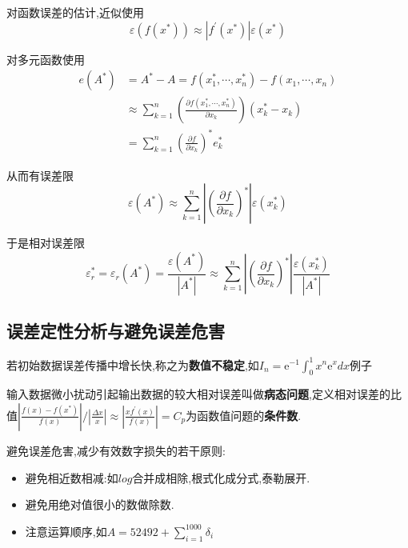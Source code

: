 \documentclass[10pt]{yerbaformat}
\begin{document}
\par 对函数误差的估计,近似使用$$\varepsilon\left(f\left(x^{*}\right)\right) \approx\left|f^{\prime}\left(x^{*}\right)\right| \varepsilon\left(x^{*}\right)$$
\par 对多元函数使用$$\begin{aligned}
        e\left(A^{*}\right) & =A^{*}-A=f\left(x_{1}^{*}, \cdots, x_{n}^{*}\right)-f\left(x_{1}, \cdots, x_{n}\right)                                                    \\
                            & \approx \sum_{k=1}^{n}\left(\frac{\partial f\left(x_{1}^{*}, \cdots, x_{n}^{*}\right)}{\partial x_{k}}\right)\left(x_{k}^{*}-x_{k}\right) \\
                            & =\sum_{k=1}^{n}\left(\frac{\partial f}{\partial x_{k}}\right)^{*} e_{k}^{*}
    \end{aligned}$$
\par 从而有误差限$$\varepsilon\left(A^{*}\right) \approx \sum_{k=1}^{n}\left|\left(\frac{\partial f}{\partial x_{k}}\right)^{*}\right| \varepsilon\left(x_{k}^{*}\right)$$
\par 于是相对误差限$$\varepsilon_{r}^{*}=\varepsilon_{r}\left(A^{*}\right)=\frac{\varepsilon\left(A^{*}\right)}{\left|A^{*}\right|} \approx \sum_{k=1}^{n}\left|\left(\frac{\partial f}{\partial x_{k}}\right)^{*}\right| \frac{\varepsilon\left(x_{k}^{*}\right)}{\left|A^{*}\right|}$$

\subsection{误差定性分析与避免误差危害}
\par 若初始数据误差传播中增长快,称之为\textbf{数值不稳定},如$I_{n}=\mathrm{e}^{-1} \int_{0}^{1} x^{n} \mathrm{e}^{x} d x$例子

\begin{definition}[病态]
    输入数据微小扰动引起输出数据的较大相对误差叫做\textbf{病态问题},定义相对误差的比值$\left|\frac{f(x)-f\left(x^{*}\right)}{f(x)}\right| /\left|\frac{\Delta x}{x}\right| \approx\left|\frac{x f^{\prime}(x)}{f(x)}\right|=C_{p}$为函数值问题的\textbf{条件数}.
\end{definition}

\par 避免误差危害,减少有效数字损失的若干原则:
\begin{itemize}
    \item 避免相近数相减:如$log$合并成相除,根式化成分式,泰勒展开.
    \item 避免用绝对值很小的数做除数.
    \item 注意运算顺序,如$A=52492+\sum_{i=1}^{1000} \delta_{i}$
\end{itemize}
\end{document}
